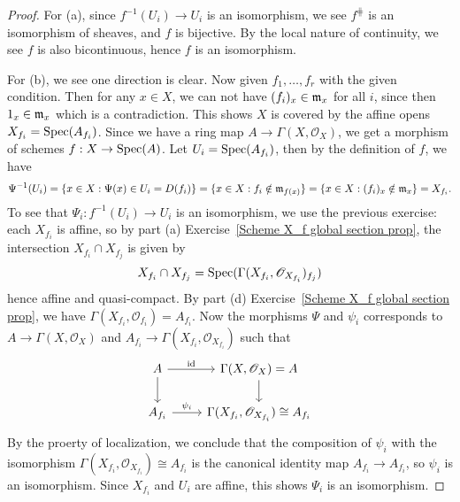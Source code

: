 \documentclass[11pt]{book}
\theoremstyle{definition}
\begin{document}
\begin{proof}
For (a), since $f^{-1}(U_i)\to U_i$ is an isomorphism, we see $f^{\hash}$ is an isomorphism of sheaves, and $f$ is bijective. By the local nature of continuity, we see $f$ is also bicontinuous, hence $f$ is an isomorphism.\par
For (b), we see one direction is clear. Now given $f_1,\dots,f_r$ with the given condition. Then for any $x\in X$, we can not have $(f_i)_x\in\mathfrak{m}_x$ for all $i$, since then $1_x\in\mathfrak{m}_x$ which is a contradiction. This shows $X$ is covered by the affine opens $X_{f_i}=\mathrm{Spec}(A_{f_i})$. Since we have a ring map $A\to\Gamma(X,\mathscr{O}_X)$, we get a morphism of schemes $f:X\to\mathrm{Spec}(A)$. Let $U_i=\mathrm{Spec}(A_{f_i})$, then by the definition of $f$, we have
\[\Psi^{-1}(U_i)=\{x\in X:\Psi(x)\in U_i=D(f_i)\}=\{x\in X:f_i\notin\mathfrak{m}_{f(x)}\}=\{x\in X:(f_i)_x\notin\mathfrak{m}_x\}=X_{f_i}.\]
To see that $\Psi_i:f^{-1}(U_i)\to U_i$ is an isomorphism, we use the previous exercise: each $X_{f_i}$ is affine, so by part (a) Exercise~\ref{Scheme X_f global section prop}, the intersection $X_{f_i}\cap X_{f_j}$ is given by
\[X_{f_i}\cap X_{f_j}=\mathrm{Spec}(\Gamma(X_{f_i},\mathscr{O}_{X_{f_i}})_{f_j})\]
hence affine and quasi-compact. By part (d) Exercise~\ref{Scheme X_f global section prop}, we have $\Gamma(X_{f_i},\mathscr{O}_{f_i})=A_{f_i}$. Now the morphisms $\Psi$ and $\psi_i$ corresponds to $A\to\Gamma(X,\mathscr{O}_X)$ and $A_{f_i}\to\Gamma(X_{f_i},\mathscr{O}_{X_{f_i}})$ such that
\[\begin{tikzcd}
A\ar[d]\ar[r,"\id"]&\Gamma(X,\mathscr{O}_X)=A\ar[d]\\
A_{f_i}\ar[r,"\psi_i"]&\Gamma(X_{f_i},\mathscr{O}_{X_{f_i}})\cong A_{f_i}
\end{tikzcd}\]
By the proerty of localization, we conclude that the composition of $\psi_i$ with the isomorphism $\Gamma(X_{f_i},\mathscr{O}_{X_{f_i}})\cong A_{f_i}$ is the canonical identity map $A_{f_i}\to A_{f_i}$, so $\psi_i$ is an isomorphism. Since $X_{f_i}$ and $U_i$ are affine, this shows $\Psi_i$ is an isomorphism.
\end{proof}
\end{document}

